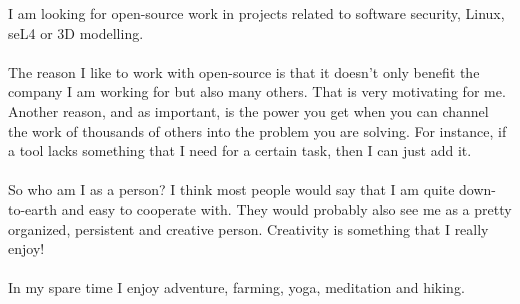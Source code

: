 I am looking for open-source work in projects related to software security, Linux, seL4 or 3D modelling.\\\\
The reason I like to work with open-source is that it doesn't only benefit the company I am working for but also many others. That is very motivating for me. Another reason, and as important, is the power you get when you can channel the work of thousands of others into the problem you are solving. For instance, if a tool lacks something that I need for a certain task, then I can just add it.\\\\
So who am I as a person? I think most people would say that I am quite down-to-earth and easy to cooperate with. They would probably also see me as a pretty organized, persistent and creative person. Creativity is something that I really enjoy!\\\\
In my spare time I enjoy adventure, farming, yoga, meditation and hiking.
